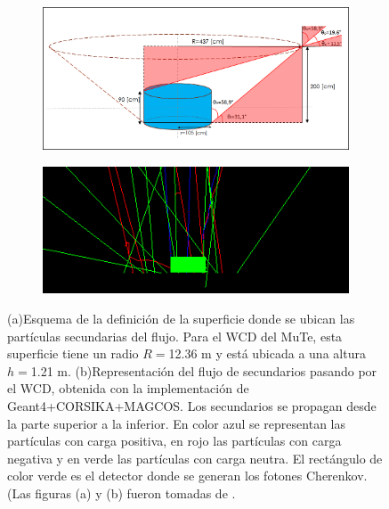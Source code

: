 \documentclass[12pt,oneside,openany,letter]{book}
\begin{document}
\begin{figure}[h]
\begin{center}

\begin{subfigure}{0.7\textwidth}
\includegraphics[width=\textwidth]{andrei1.png}
\caption{}
\label{andrei1}
\end{subfigure}

\begin{subfigure}{0.7\textwidth}
\includegraphics[width=\textwidth]{andrei2.png}
\caption{}
\label{andrei2}
\end{subfigure}
\end{center}

 \caption[Ubicaci\'on y propagaci\'on del flujo de secundarios sobre un WCD]{(a)Esquema de la definici\'on de la superficie donde se ubican las part\'iculas secundarias del flujo. Para el WCD del MuTe, esta superficie tiene un radio $R=$12.36 m y est\'a ubicada a una altura $h=$1.21 m. (b)Representaci\'on del flujo de secundarios pasando por el WCD, obtenida con la implementaci\'on de Geant4+CORSIKA+MAGCOS. Los secundarios se propagan desde la parte superior a la inferior. En color azul se representan las part\'iculas con carga positiva, en rojo las part\'iculas con carga negativa y
en verde las part\'iculas con carga neutra. El rect\'angulo de color verde es el detector donde se generan los fotones Cherenkov. (Las figuras (a) y (b) fueron tomadas de \cite{JaimesMotta2018}.}
  \label{figura1}
\end{figure}
\end{document}

